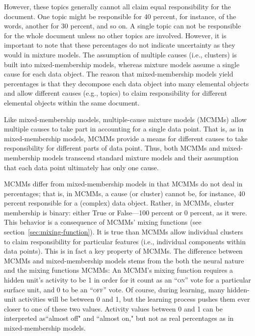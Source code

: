 However, these topics generally cannot all claim equal responsibility
for the document. One topic might be responsible for 40 percent, for instance,
of the words, another for 30 percent, and so on. A single topic can not be responsible for the whole 
document unless no other topics are involved.  However, it is important to note that these 
percentages do not indicate uncertainty as they would in mixture models. The assumption
of multiple causes (i.e., clusters) is built 
into mixed-membership models, whereas mixture models assume a single cause for each 
data object. The reason that mixed-membership models yield percentages is 
that they decompose each data object into many elemental objects and allow different causes (e.g., topics) to claim responsibility for different elemental objects within the same document. 

Like mixed-membership models, multiple-cause mixture models (MCMMs) allow multiple causes to take part in accounting for a single data point. That is, as in mixed-membership models, MCMMs provide a means for different causes to take responsibility for different parts of data point. Thus, both MCMMs and mixed-membership models transcend standard mixture models and their assumption that each data point ultimately has only one cause. %

MCMMs differ from mixed-membership models in that MCMMs do not deal in percentages; that is, in MCMMs, a cause (or cluster) cannot be, for instance, 40 percent responsible for a (complex) data object. Rather, in MCMMs, cluster membership is binary: either True or False---100 percent or 0 percent, as it were. This behavior is a consequence of MCMMs' mixing functions (see section~\ref{sec:mixing-function}). It is true than MCMMs allow individual clusters to claim responsibility for particular features (i.e., individual components within data points). This is in fact a key property of MCMMs. The difference between MCMMs and mixed-membership models stems from the both the neural nature and the mixing functions MCMMs: An MCMM's mixing function requires a hidden unit's activity to be 1 in order for it count as an ``\textsc{on}'' vote for a particular surface unit, and 0 to be an ``\textsc{off}'' vote. Of course, during learning, many hidden-unit activities will be between 0 and 1, but the learning process pushes them ever closer to one of these two values. Activity values between 0 and 1 can be interpreted as``almost off" and ``almost on," but not as real percentages as in mixed-membership models. 

